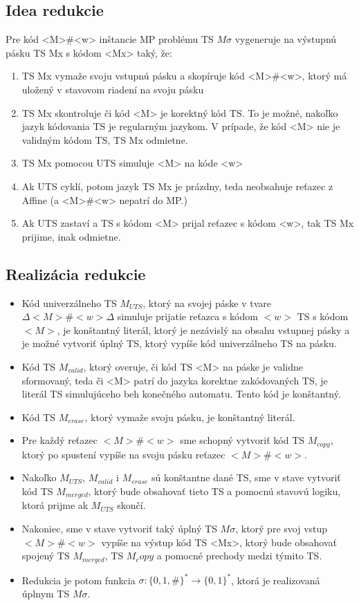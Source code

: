 \documentclass[10pt]{article}
\begin{document}
\subsection*{Idea redukcie}
Pre kód <M>\#<w> inštancie MP problému TS $M\sigma$ vygeneruje na výstupnú pásku TS Mx s kódom <Mx> taký, že:
\begin{enumerate}
    \item TS Mx vymaže svoju vstupnú pásku a skopíruje kód <M>\#<w>, ktorý má uložený v stavovom
        riadení na svoju pásku
    \item TS Mx skontroluje či kód <M> je korektný kód TS. To je možné, nakoľko jazyk kódovania TS
        je regularným jazykom. V prípade, že kód <M> nie je validným kódom TS, TS Mx odmietne. 
    \item TS Mx pomocou UTS simuluje <M> na kóde <w>
    \item Ak UTS cyklí, potom jazyk TS Mx je prázdny, teda neobsahuje reťazec z Affine (a
        <M>\#<w> nepatrí do MP.)
    \item Ak UTS zastaví a TS s kódom <M> prijal reťazec s kódom <w>, tak TS Mx prijime, inak odmietne.
\end{enumerate}

\subsection*{Realizácia redukcie}
\begin{itemize}
    \item Kód univerzálneho TS $M_{UTS}$, ktorý na svojej páske v tvare $\Delta <M>\#<w> \Delta$ simuluje
        prijatie reťazca s kódom $<w>$ TS s kódom $<M>$, je konštantný literál, ktorý je nezávislý
        na obsahu vstupnej pásky a je možné vytvoriť úplný TS, ktorý vypíše kód univerzálneho TS na pásku. 
    \item Kód TS $M_{valid}$, ktorý overuje, či kód TS <M> na páske je validne sformovaný, teda či <M> patrí do jazyka
        korektne zakódovaných TS, je literál TS simulujúceho beh konečného automatu. Tento kód je
        konštantný.
    \item Kód TS $M_{erase}$, ktorý vymaže svoju pásku, je konštantný literál. 
    \item Pre každý reťazec $<M>\#<w>$ sme schopný vytvoriť kód TS $M_{copy}$, ktorý po spustení vypíše na svoju
        pásku reťazec $<M>\#<w>$. 
    \item Nakoľko $M_{UTS}$, $M_{valid}$ i $M_{erase}$ sú konštantne dané TS, sme v stave vytvoriť
        kód TS $M_{merged}$, ktorý bude obsahovať tieto TS a pomocnú stavovú logiku, ktorá prijme ak $M_{UTS}$
        skončí.
    \item Nakoniec, sme v stave vytvoriť taký úplný TS $M\sigma$, ktorý pre svoj vstup $<M>\#<w>$ vypíše na
        výstup kód TS <Mx>, ktorý bude obsahovať spojený TS $M_{merged}$, TS $M_copy$ a pomocné
        prechody medzi týmito TS.
    
    \item Redukcia je potom funkcia $\sigma: \{0,1,\#\}^* \to \{0,1\}^*$, ktorá je realizovaná úplnym
    TS $M\sigma$.
\end{itemize}
\end{document}
